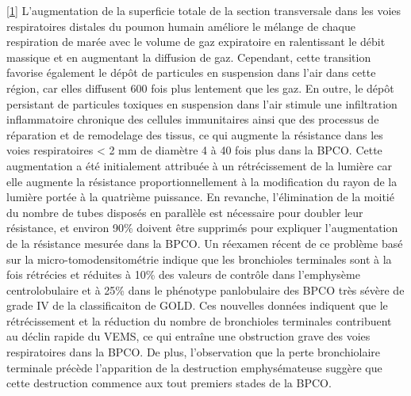 \documentclass[12pt,]{article}
\begin{document}
{[}\protect\hyperlink{ref-hogg2013small}{1}{]} L'augmentation de la
superficie totale de la section transversale dans les voies
respiratoires distales du poumon humain améliore le mélange de chaque
respiration de marée avec le volume de gaz expiratoire en ralentissant
le débit massique et en augmentant la diffusion de gaz. Cependant, cette
transition favorise également le dépôt de particules en suspension dans
l'air dans cette région, car elles diffusent 600 fois plus lentement que
les gaz. En outre, le dépôt persistant de particules toxiques en
suspension dans l'air stimule une infiltration inflammatoire chronique
des cellules immunitaires ainsi que des processus de réparation et de
remodelage des tissus, ce qui augmente la résistance dans les voies
respiratoires \textless{} 2 mm de diamètre 4 à 40 fois plus dans la
BPCO. Cette augmentation a été initialement attribuée à un
rétrécissement de la lumière car elle augmente la résistance
proportionnellement à la modification du rayon de la lumière portée à la
quatrième puissance. En revanche, l'élimination de la moitié du nombre
de tubes disposés en parallèle est nécessaire pour doubler leur
résistance, et environ 90\% doivent être supprimés pour expliquer
l'augmentation de la résistance mesurée dans la BPCO. Un réexamen récent
de ce problème basé sur la micro-tomodensitométrie indique que les
bronchioles terminales sont à la fois rétrécies et réduites à 10\% des
valeurs de contrôle dans l'emphysème centrolobulaire et à 25\% dans le
phénotype panlobulaire des BPCO très sévère de grade IV de la
classificaiton de GOLD. Ces nouvelles données indiquent que le
rétrécissement et la réduction du nombre de bronchioles terminales
contribuent au déclin rapide du VEMS, ce qui entraîne une obstruction
grave des voies respiratoires dans la BPCO. De plus, l'observation que
la perte bronchiolaire terminale précède l'apparition de la destruction
emphysémateuse suggère que cette destruction commence aux tout premiers
stades de la BPCO.
\end{document}
